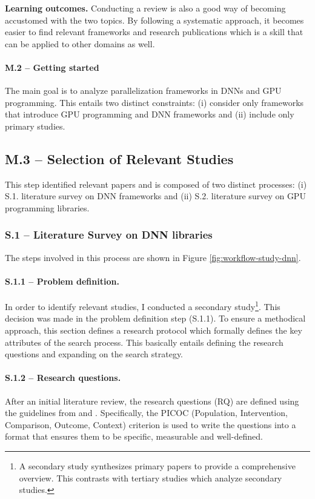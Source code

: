 \textbf{Learning outcomes.}
Conducting a review is also a good way of becoming accustomed with the two topics. By following a
systematic approach, it becomes easier to find relevant frameworks and research publications which
is a skill that can be applied to other domains as well.

\paragraph{M.2 -- Getting started}
\label{sec:research_questions}
The main goal is to analyze parallelization frameworks in DNNs and GPU programming. This entails two distinct
constraints: (i) consider only frameworks that introduce GPU programming and DNN frameworks and (ii) include
only primary studies.

\subsection{M.3 -- Selection of Relevant Studies}
This step identified relevant papers and is composed of two distinct processes: (i) S.1. literature
survey on DNN frameworks and (ii) S.2. literature survey on GPU programming libraries.

\subsubsection{S.1 -- Literature Survey on DNN libraries}
The steps involved in this process are shown in Figure \ref{fig:workflow-study-dnn}.

\paragraph{S.1.1 -- Problem definition.}
In order to identify relevant studies, I conducted a secondary study\footnote{A secondary study
	synthesizes primary papers to provide a comprehensive overview. This contrasts with tertiary
	studies which analyze secondary studies.}. This decision was made in the problem definition step
(S.1.1). To ensure a methodical approach, this section defines a research protocol which formally
defines the key attributes of the search process. This basically entails defining the research
questions and expanding on the search strategy.

\paragraph{S.1.2 -- Research questions.}
After an initial literature review, the research questions (RQ) are defined using the guidelines
from \cite{kitchenham_evidence-based_2015} and \cite{keele_systematic_2007}. Specifically, the
PICOC (Population, Intervention, Comparison, Outcome, Context) criterion is used to write the
questions into a format that ensures them to be specific, measurable and well-defined.

